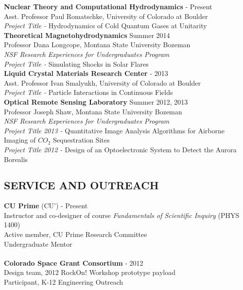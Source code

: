 \documentclass[11pt,a4paper]{article}
\begin{document}
\textbf{Nuclear Theory and Computational Hydrodynamics}  - Present \\
Asst. Professor Paul Romatschke, University of Colorado at Boulder \\
\textit{Project Title -} Hydrodynamics of Cold Quantum Gases at Unitarity \\

\noindent
\textbf{Theoretical Magnetohydrodynamics} \dotfill Summer 2014 \\
Professor Dana Longcope, Montana State University Bozeman \\
\textit{NSF Research Experiences for Undergraduates Program} \\
\textit{Project Title -} Simulating Shocks in Solar Flares \\

\noindent
\textbf{Liquid Crystal Materials Research Center}  - 2013 \\
Asst. Professor Ivan Smalyukh, University of Colorado at Boulder \\
\textit{Project Title -} Particle Interactions in Continuous Fields \\

\noindent
\textbf{Optical Remote Sensing Laboratory} \dotfill Summer 2012, 2013 \\
Professor Joseph Shaw, Montana State University Bozeman \\
\textit{NSF Research Experiences for Undergraduates Program} \\
\textit{Project Title 2013 -} Quantitative Image Analysis Algorithms for Airborne Imaging of $CO_2$ Sequestration Sites \\
\textit{Project Title 2012 -} Design of an Optoelectronic System to Detect the Aurora Borealis \\

\subsection*{SERVICE AND OUTREACH}

\textbf{CU Prime} (CU')  - Present \\
Instructor and co-designer of course \textit{Fundamentals of Scientific Inquiry} (PHYS 1400) \\
Active member, CU Prime Research Committee \\
Undergraduate Mentor
\\
\\
\textbf{Colorado Space Grant Consortium}  - 2012 \\
Design team, 2012 RockOn! Workshop prototype payload \\
Participant, K-12 Engineering Outreach \\
\end{document}
